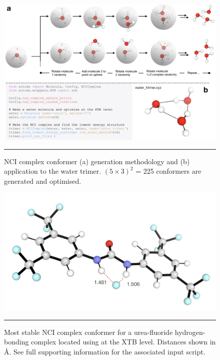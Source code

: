 \documentclass[../../main.tex]{subfiles}
\begin{document}
\begin{figure}[h!]
	\vspace{0.4cm}
	\centering
	\includegraphics[width=\textwidth]{5/autode/figs/figS11}
	\vspace{0.4cm}
	\hrule
	\caption{NCI complex conformer (a) generation methodology and (b) application to the water trimer. $(5\times3)^2$ = 225 conformers are generated and optimised.}
	\label{fig::ade_si_11}
\end{figure}



\begin{figure}[h!]
	\vspace{0.4cm}
	\centering
	\includegraphics[width=12cm]{5/autode/figs/figS12}
	\vspace{0.4cm}
	\hrule
	\caption{Most stable NCI complex conformer for a urea-fluoride hydrogen-bonding complex located using \ade at the XTB level. Distances shown in \AA. See full supporting information for the associated input script.}
	\label{fig::ade_si_12}
\end{figure}

\clearpage
\end{document}
